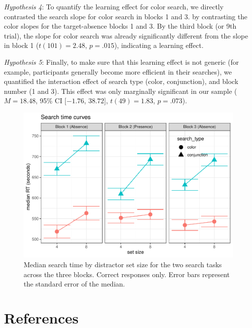 \documentclass[
  english,
  man]{apa6}
\begin{document}
\emph{Hypothesis 4}: To quantify the learning effect for color search, we directly contrasted the search slope for color search in blocks 1 and 3. by contrasting the color slopes for the target-absence blocks 1 and 3. By the third block (or 9th trial), the slope for color search was already significantly different from the slope in block 1 (\(t(101) = 2.48\), \(p = .015\)), indicating a learning effect.

\emph{Hypothesis 5}: Finally, to make sure that this learning effect is not generic (for example, participants generally become more efficient in their searches), we quantified the interaction effect of search type (color, conjunction), and block number (1 and 3). This effect was only marginally significant in our sample (\(M = 18.48\), 95\% CI \([-1.76\), \(38.72]\), \(t(49) = 1.83\), \(p = .073\)).

\begin{figure}
\centering
\includegraphics{termination_files/figure-latex/RT-pilot-1.pdf}
\caption{\label{fig:RT-pilot}Median search time by distractor set size for the two search tasks across the three blocks. Correct responses only. Error bars represent the standard error of the median.}
\end{figure}

\newpage

\hypertarget{references-1}{%
\section{References}\label{references-1}}

\begingroup
\setlength{\parindent}{-0.5in}
\setlength{\leftskip}{0.5in}
\end{document}
